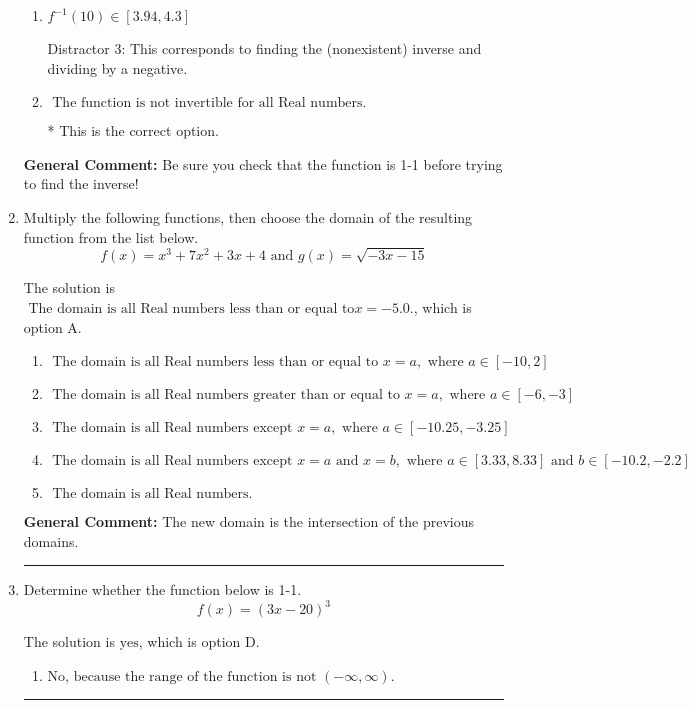 \documentclass{extbook}[14pt]
\newcommand{\litem}[1]{\item #1

\rule{\textwidth}{0.4pt}}
\begin{document}
\begin{enumerate}
{\begin{enumerate}[label=\Alph*.]
 Distractor 1: This corresponds to trying to find the inverse even though the function is not 1-1. 
\item \( f^{-1}(10) \in [3.94, 4.3] \)

 Distractor 3: This corresponds to finding the (nonexistent) inverse and dividing by a negative.
\item \( \text{ The function is not invertible for all Real numbers. } \)

* This is the correct option.
\end{enumerate}

\textbf{General Comment:} Be sure you check that the function is 1-1 before trying to find the inverse!
}
\litem{
Multiply the following functions, then choose the domain of the resulting function from the list below.
\[ f(x) = x^{3} +7 x^{2} +3 x + 4 \text{ and } g(x) = \sqrt{-3x-15}  \]

The solution is \( \text{ The domain is all Real numbers less than or equal to} x = -5.0. \), which is option A.\begin{enumerate}[label=\Alph*.]
\item \( \text{ The domain is all Real numbers less than or equal to } x = a, \text{ where } a \in [-10, 2] \)


\item \( \text{ The domain is all Real numbers greater than or equal to } x = a, \text{ where } a \in [-6, -3] \)


\item \( \text{ The domain is all Real numbers except } x = a, \text{ where } a \in [-10.25, -3.25] \)


\item \( \text{ The domain is all Real numbers except } x = a \text{ and } x = b, \text{ where } a \in [3.33, 8.33] \text{ and } b \in [-10.2, -2.2] \)


\item \( \text{ The domain is all Real numbers. } \)


\end{enumerate}

\textbf{General Comment:} The new domain is the intersection of the previous domains.
}
\litem{
Determine whether the function below is 1-1.
\[ f(x) = (3 x - 20)^3 \]

The solution is \( \text{yes} \), which is option D.\begin{enumerate}[label=\Alph*.]
\item \( \text{No, because the range of the function is not $(-\infty, \infty)$.} \)


\end{enumerate}}
\end{enumerate}
\end{document}

